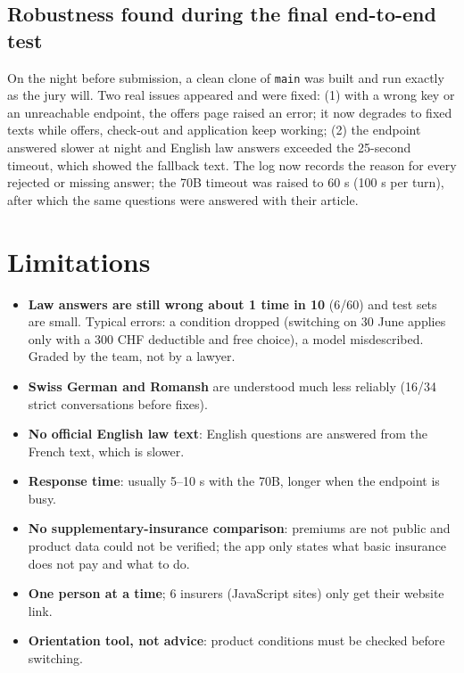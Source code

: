 \documentclass[10pt,a4paper]{article}
\newcommand{\gras}[1]{\textbf{#1}}
\begin{document}
\subsection{Robustness found during the final end-to-end test}
On the night before submission, a clean clone of \texttt{main} was built and run exactly as the jury will. Two real
issues appeared and were fixed: (1) with a wrong key or an unreachable endpoint, the offers page raised an error; it
now degrades to fixed texts while offers, check-out and application keep working; (2) the endpoint answered slower
at night and English law answers exceeded the 25-second timeout, which showed the fallback text. The log now
records the reason for every rejected or missing answer; the 70B timeout was raised to 60 s (100 s per turn), after
which the same questions were answered with their article.

\section{Limitations}
\begin{itemize}
\item \gras{Law answers are still wrong about 1 time in 10} (6/60) and test sets are small. Typical errors: a
  condition dropped (switching on 30 June applies only with a 300 CHF deductible and free choice), a model
  misdescribed. Graded by the team, not by a lawyer.
\item \gras{Swiss German and Romansh} are understood much less reliably (16/34 strict conversations before fixes).
\item \gras{No official English law text}: English questions are answered from the French text, which is slower.
\item \gras{Response time}: usually 5–10 s with the 70B, longer when the endpoint is busy.
\item \gras{No supplementary-insurance comparison}: premiums are not public and product data could not be
  verified; the app only states what basic insurance does not pay and what to do.
\item \gras{One person at a time}; 6 insurers (JavaScript sites) only get their website link.
\item \gras{Orientation tool, not advice}: product conditions must be checked before switching.
\end{itemize}

\end{document}
